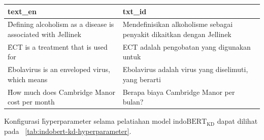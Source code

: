 \begin{table}
    \centering
    \label{tab:sentence-parallel}
    \begin{tabular}{|p{5cm}|p{5cm}|}
        \hline
        \textbf{text\_en} & \textbf{txt\_id} \\
        \hline
        \f{Defining alcoholism as a disease is associated with Jellinek} & Mendefinisikan alkoholisme sebagai penyakit dikaitkan dengan Jellinek \\
        \hline
        \f{ECT is a treatment that is used for} & ECT adalah pengobatan yang digunakan untuk \\
        \hline
        \f{Ebolavirus is an enveloped virus, which means} & Ebolavirus adalah virus yang diselimuti, yang berarti \\
        \hline
        \f{How much does Cambridge Manor cost per month} & Berapa biaya Cambridge Manor per bulan? \\
        \hline
    \end{tabular}
\end{table}

Konfigurasi \f{hyperparameter} selama pelatiahan model $\text{indoBERT}_{\text{KD}}$ dapat  dilihat pada \tab~\ref{tab:indobert-kd-hyperparameter}.

